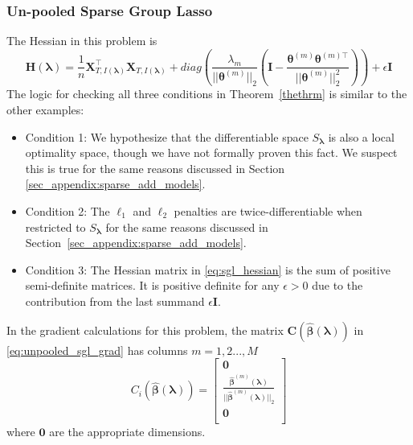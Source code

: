 \documentclass[12pt,letterpaper]{article}
\begin{document}
\subsubsection{Un-pooled Sparse Group Lasso}
The Hessian in this problem is
\begin{equation}
\boldsymbol{H}(\boldsymbol\lambda) =
\frac{1}{n} \boldsymbol X_{T, I(\boldsymbol \lambda)}^\top \boldsymbol X_{T, I(\boldsymbol \lambda)}
+ diag\left(
\frac{\lambda_m}{|| \boldsymbol \theta^{(m)}||_2}
\left (
\boldsymbol I - 
\frac{\boldsymbol \theta^{(m)} \boldsymbol \theta^{(m) \top}}{|| \boldsymbol \theta^{(m)}||_2^2}
\right )
\right)
+ \epsilon \boldsymbol I
\label{eq:sgl_hessian}
\end{equation}
The logic for checking all three conditions in Theorem~\ref{thethrm} is similar to the other examples:
\begin{itemize}
	\item[] Condition 1: We hypothesize that the differentiable space $S_{\boldsymbol{\lambda}}$ is also a local optimality space, though we have not formally proven this fact. We suspect this is true for the same reasons discussed in Section \ref{sec_appendix:sparse_add_models}.
	\item[] Condition 2: The $\ell_1$ and $\ell_2$ penalties are twice-differentiable when restricted to $S_{\boldsymbol{\lambda}}$ for the same reasons discussed in Section~\ref{sec_appendix:sparse_add_models}. \hfill {}
	\item[] Condition 3: The Hessian matrix in \eqref{eq:sgl_hessian} is the sum of positive semi-definite matrices. It is positive definite for any $\epsilon > 0$ due to the contribution from the last summand $\epsilon \boldsymbol{I}$. \hfill {}
\end{itemize}

In the gradient calculations for this problem, the matrix $\boldsymbol C(\hat {\boldsymbol \beta}(\boldsymbol \lambda))$ in \eqref{eq:unpooled_sgl_grad} has columns $m=1,2...,M$ 
\begin{equation}
C_i(\hat{\boldsymbol \beta}( \boldsymbol \lambda))
=
\begin{bmatrix}
\boldsymbol 0\\
\frac{\hat {\boldsymbol \beta}^{(m)}(\boldsymbol \lambda)}{||\hat{\boldsymbol \beta}^{(m)}(\boldsymbol \lambda)||_2}\\
\boldsymbol 0\\
\end{bmatrix}
\end{equation}
where $\boldsymbol 0$ are the appropriate dimensions.
\end{document}
